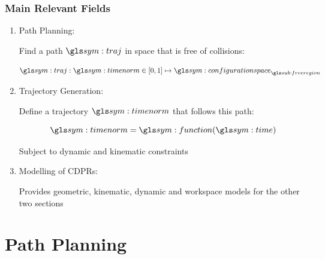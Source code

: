 \documentclass{beamer}
\begin{document}
	\begin{frame}
		\frametitle{Main Relevant Fields}

		\begin{enumerate}

			\item

				Path Planning:

				Find a path $\pathsym$ in space that is free of collisions:

				\begin{equation}
					\pathsym : \timenorm \in [0, 1] \mapsto \configurationspace_{\freeregion}
				\end{equation}


			\item

				Trajectory Generation:

				Define a trajectory $\timenorm$ that follows this path:

				\begin{equation}
					\timenorm = \function(\timesym)
				\end{equation}

				Subject to dynamic and kinematic constraints

			\item

				Modelling of CDPRs:

				Provides geometric, kinematic, dynamic and workspace models for
				the other two sections

		\end{enumerate}
	\end{frame}



\section{Path Planning}
\end{document}
